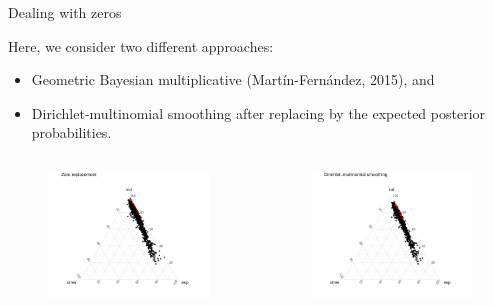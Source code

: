 \documentclass[9pt]{beamer}
\begin{document}
\begin{frame}{Dealing with zeros}

Here, we consider two different approaches: \begin{itemize}\item Geometric Bayesian multiplicative (Martín-Fernández, 2015), and \item Dirichlet-multinomial smoothing after replacing by the expected posterior probabilities.\end{itemize}%

\begin{columns}
\begin{column}{0.45\textwidth}
\begin{figure}\vspace{-0.20cm}
\includegraphics[trim=0cm 0cm 0cm 0cm,width=\textwidth]{ternary_zr.pdf}
\end{figure}
\end{column}
\begin{column}{0.45\textwidth}
\begin{figure}\vspace{-0.20cm}
\includegraphics[trim=0cm 0cm 0cm 0cm,width=\textwidth]{ternary_nz.pdf}
\end{figure}
\end{column}
\end{columns}


\end{frame}
\end{document}
